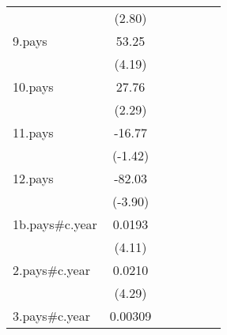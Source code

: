 {\begin{tabular}{l*{6}{c}}
                    &      (2.80)         &                     &                     &                     &                     &                     \\
[1em]
9.pays              &       53.25\sym{***}&                     &                     &                     &                     &                     \\
                    &      (4.19)         &                     &                     &                     &                     &                     \\
[1em]
10.pays             &       27.76\sym{*}  &                     &                     &                     &                     &                     \\
                    &      (2.29)         &                     &                     &                     &                     &                     \\
[1em]
11.pays             &      -16.77         &                     &                     &                     &                     &                     \\
                    &     (-1.42)         &                     &                     &                     &                     &                     \\
[1em]
12.pays             &      -82.03\sym{***}&                     &                     &                     &                     &                     \\
                    &     (-3.90)         &                     &                     &                     &                     &                     \\
[1em]
1b.pays#c.year      &      0.0193\sym{***}&                     &                     &                     &                     &                     \\
                    &      (4.11)         &                     &                     &                     &                     &                     \\
[1em]
2.pays#c.year       &      0.0210\sym{***}&                     &                     &                     &                     &                     \\
                    &      (4.29)         &                     &                     &                     &                     &                     \\
[1em]
3.pays#c.year       &     0.00309         &                     &                     &                     &                     &                     \\

\end{tabular}}
